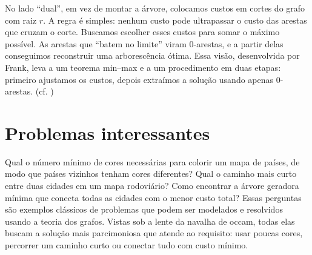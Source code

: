 No lado “dual”, em vez de montar a árvore, colocamos custos em cortes do grafo com raiz $r$. A regra é simples: nenhum custo pode ultrapassar o custo das arestas que cruzam o corte. Buscamos escolher esses custos para somar o máximo possível. As arestas que “batem no limite” viram 0-arestas, e a partir delas conseguimos reconstruir uma arborescência ótima. Essa visão, desenvolvida por Frank, leva a um teorema min–max e a um procedimento em duas etapas: primeiro ajustamos os custos, depois extraímos a solução usando apenas 0-arestas.
(cf. \cite{frank2014,schrijver2003comb})

\section{Problemas interessantes}


Qual o número mínimo de cores necessárias para colorir um mapa de países, de modo que países vizinhos tenham cores diferentes? Qual o caminho mais curto entre duas cidades em um mapa rodoviário? Como encontrar a árvore geradora mínima que conecta todas as cidades com o menor custo total? Essas perguntas são exemplos clássicos de problemas que podem ser modelados e resolvidos usando a teoria dos grafos. Vistas sob a lente da navalha de occam, todas elas buscam a solução mais parcimoniosa que atende ao requisito: usar poucas cores, percorrer um caminho curto ou conectar tudo com custo mínimo.


